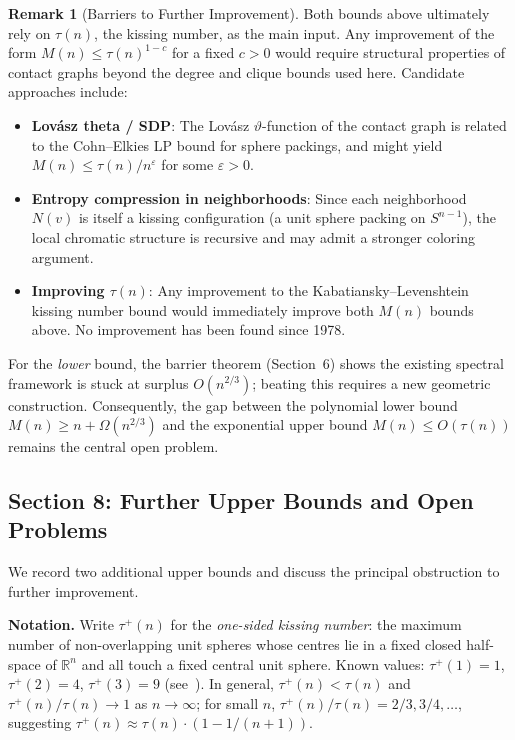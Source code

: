 \documentclass{article}
\theoremstyle{definition}
\newtheorem{remark}[theorem]{Remark}
\begin{document}
\begin{remark}[Barriers to Further Improvement]
Both bounds above ultimately rely on $\tau(n)$, the kissing number, as the main input.  Any improvement of the form $M(n)\le\tau(n)^{1-c}$ for a fixed $c>0$ would require structural properties of contact graphs beyond the degree and clique bounds used here.  Candidate approaches include:
\begin{itemize}
  \item \textbf{Lovász theta / SDP}: The Lov\'asz $\vartheta$-function of the contact graph is related to the Cohn--Elkies LP bound for sphere packings, and might yield $M(n)\le\tau(n)/n^{\varepsilon}$ for some $\varepsilon>0$.
  \item \textbf{Entropy compression in neighborhoods}: Since each neighborhood $N(v)$ is itself a kissing configuration (a unit sphere packing on $S^{n-1}$), the local chromatic structure is recursive and may admit a stronger coloring argument.
  \item \textbf{Improving $\tau(n)$}: Any improvement to the Kabatiansky--Levenshtein kissing number bound would immediately improve both $M(n)$ bounds above.  No improvement has been found since 1978.
\end{itemize}
For the \emph{lower} bound, the barrier theorem (Section~6) shows the existing spectral framework is stuck at surplus $O(n^{2/3})$; beating this requires a new geometric construction.  Consequently, the gap between the polynomial lower bound $M(n)\ge n+\Omega(n^{2/3})$ and the exponential upper bound $M(n)\le O(\tau(n))$ remains the central open problem.
\end{remark}

\subsection*{Section 8: Further Upper Bounds and Open Problems}

We record two additional upper bounds and discuss the principal obstruction to further improvement.

\medskip
\textbf{Notation.}  Write $\tau^+(n)$ for the \emph{one-sided kissing number}: the maximum number of non-overlapping unit spheres whose centres lie in a fixed closed half-space of $\mathbb{R}^n$ and all touch a fixed central unit sphere.  Known values: $\tau^+(1)=1$, $\tau^+(2)=4$, $\tau^+(3)=9$ (see~\cite{BvM2022}).  In general, $\tau^+(n)<\tau(n)$ and $\tau^+(n)/\tau(n)\to 1$ as $n\to\infty$; for small $n$, $\tau^+(n)/\tau(n) = 2/3, 3/4, \ldots$, suggesting $\tau^+(n) \approx \tau(n)\cdot(1-1/(n+1))$.
\end{document}
